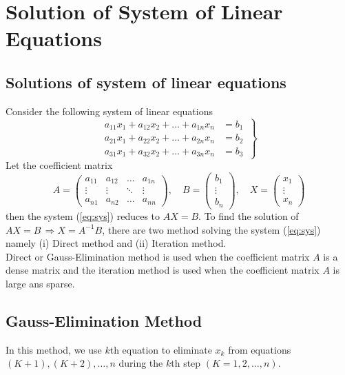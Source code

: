 \documentclass[12pt,class=book,crop=false]{standalone}
\begin{document}
\chapter{Solution of System of Linear Equations}
\section{Solutions of system of linear equations}
Consider the following system of linear equations
\begin{equation}
    \left.\begin{aligned}
        a_{11}x_1+a_{12}x_2+\dots+a_{1n}x_n & =b_1 \\
        a_{21}x_1+a_{22}x_2+\dots+a_{2n}x_n & =b_2 \\
        a_{31}x_1+a_{32}x_2+\dots+a_{3n}x_n & =b_3
    \end{aligned}\,\right\}\label{eq:sys}
\end{equation}
Let the coefficient matrix
\[
    A=\begin{pmatrix}
        a_{11} & a_{12} & \dots  & a_{1n} \\
        \vdots & \vdots & \ddots & \vdots \\
        a_{n1} & a_{n2} & \dots  & a_{nn}
    \end{pmatrix},
    \quad B=\begin{pmatrix}
        b_1    \\
        \vdots \\
        b_n
    \end{pmatrix},
    \quad X=\begin{pmatrix}
        x_1    \\
        \vdots \\
        x_n
    \end{pmatrix}
\]
then the system (\ref{eq:sys}) reduces to \( AX=B \). To find the solution of \( AX=B \,\Rightarrow X=A^{-1}B \), there are two method solving the system (\ref{eq:sys}) namely (i) Direct method and (ii) Iteration method.\\
Direct or Gauss-Elimination method is used when the coefficient matrix \( A \) is a dense matrix and the iteration method is used when the coefficient matrix \( A \) is large ans sparse.
\section{Gauss-Elimination Method}
In this method, we use \( k \)th equation to eliminate \( x_k \) from equations \( (K+1),(K+2),\dots,n \) during the \( k \)th step \( (K=1,2,\dots, n) \).
\end{document}
